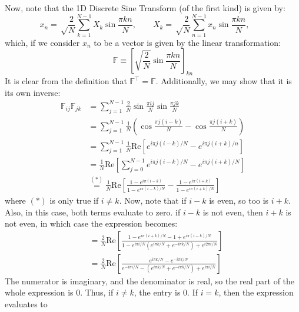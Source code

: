\documentclass[reqno]{article}
\begin{document}
	Now, note that the 1D Discrete Sine Transform (of the first kind) is given by:
	\begin{equation}
		x_n = \sqrt\frac{2}{N}\sum_{k=1}^{N-1} X_k \sin \frac{\pi kn}{N}, \qquad
		X_k = \sqrt\frac{2}{N}\sum_{n=1}^{N-1} x_n \sin \frac{\pi kn}{N}, \qquad
	\end{equation}
	which, if we consider $x_n$ to be a vector is given by the linear transformation:
	\begin{equation}
		\mathbb{F} \equiv \left[ \sqrt{\frac{2}{N}} \sin \frac{\pi k n}{N} \right]_{kn}
	\end{equation}
	It is clear from the definition that $\mathbb{F}^\top = \mathbb{F}$. Additionally, we may show that it is its own inverse:
	\begin{equation}
	\begin{split}
		\mathbb{F}_{ij} \mathbb{F}_{jk} &= \sum_{j = 1}^{N - 1} \frac{2}{N} \sin \frac{\pi ij}{N} \sin \frac{\pi j k}{N} \\
		&= \sum_{j = 1}^{N - 1} \frac{1}{N} \left( \cos \frac{\pi j (i - k)}{N} - \cos \frac{\pi j (i + k)}{N} \right) \\
		&= \sum_{j = 1}^{N - 1} \frac{1}{N} \text{Re} \left[ e^{i\pi j(i - k)/N} - e^{i \pi j(i + k)/n} \right] \\
		&= \frac{1}{N} \text{Re} \left[ \sum_{j = 0}^{N - 1} e^{i\pi j(i - k)/N} - e^{i \pi j(i + k)/N} \right] \\
		&\overset{(*)}{=} \frac{1}{N} \text{Re} \left[ \frac{1 - e^{i\pi (i - k)}}{1 - e^{i \pi (i - k)/N}} - \frac{1 - e^{i\pi(i + k)}}{1 - e^{i \pi (i + k)/N}} \right]
	\end{split}
	\end{equation}
	where $(*)$ is only true if $i \neq k$. Now, note that if $i - k$ is even, so too is $i + k$. Also, in this case, both terms evaluate to zero. if $i - k$ is not even, then $i + k$ is not even, in which case the expression becomes:
	\begin{equation}
	\begin{split}
		&= \frac{2}{N} \text{Re} \left[ \frac{1 - e^{i\pi(i + k)/N} - 1 + e^{i\pi (i - k)/N}}{1 - e^{i\pi i/N}\left( e^{i\pi k/N} + e^{-i \pi k/N} \right) + e^{i 2\pi i/N}} \right] \\
		&= \frac{2}{N} \text{Re} \left[ \frac{e^{i\pi k/N} - e^{-i\pi  k/N}}{e^{-i\pi i/N} - \left( e^{i\pi k/N} + e^{-i \pi k/N} \right) + e^{i \pi i/N}} \right]
	\end{split}
	\end{equation}
	The numerator is imaginary, and the denominator is real, so the real part of the whole expression is 0. Thus, if $i \neq k$, the entry is 0. If $i = k$, then the expression evaluates to
\end{document}
